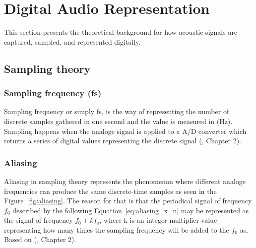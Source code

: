 
\section{Digital Audio Representation}
            \label{sec:SignalProcessing}

    This section presents the theoretical background for how acoustic signals are captured, sampled, and represented digitally.

        
            
        
    
    \subsection{Sampling theory}
        \label{sec:SamplingTheory}
        \subsubsection{Sampling frequency (fs)}
             Sampling frequency or simply fs, is the way of representing the number of discrete samples gathered in one second and the value is measured in (Hz). Sampling happens when the analoge signal is applied to a A/D converter which returns a series of digital values representing the discrete signal (\cite{understanding_dsp}, Chapter 2).

         \subsubsection{Aliasing}
            Aliasing in sampling theory represents the phenomenon where different analoge frequencies can produce the same discrete-time samples as seen in the Figure~\ref{fig:aliasing}. The reason for that is that the periodical signal of frequency $f_0$ described by the following Equation~\ref{eq:aliasing_x_n} may be represented as the signal of frequency $f_0 + kf_s$, where k is an integer multiplier value representing how many times the sampling frequency will be added to the $f_0$ as. Based on (\cite{understanding_dsp}, Chapter 2).

